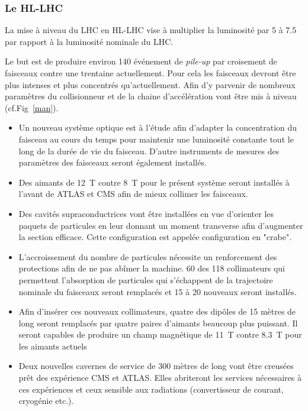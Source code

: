 \subsubsection{Le HL-LHC}
La mise à niveau du LHC en HL-LHC vise à multiplier la luminosité par \num{5} à \num{7.5} par rapport à la luminosité nominale du LHC.

Le but est de produire environ \num{140} événement de \textit{pile-up} par croisement de faisceaux contre une trentaine actuellement. Pour cela les faisceaux devront être plus intenses et plus concentrés qu'actuellement. Afin d'y parvenir de nombreux paramètres du collisionneur et de la chaine d'accélération vont être mis à niveau (cf.Fig~\ref{man}).

\begin{itemize}[label=$\bullet$]
	
 \item Un nouveau système optique est à l'étude afin d'adapter la concentration du faisceau au cours du temps pour maintenir une luminosité constante tout le long de la durée de vie du faisceau. D'autre instruments de mesures des paramètres des faisceaux seront également installés.
 
 \item Des aimants de \SI{12}{\tesla} contre \SI{8}{\tesla} pour le présent système seront installés à l'avant de ATLAS et CMS afin de mieux collimer les faisceaux.
 
 \item Des cavités supraconductrices vont être installées en vue d'orienter les paquets de particules en leur donnant un moment transverse afin d'augmenter la section efficace. Cette configuration est appelée configuration en "crabe".
 
 \item L'accroissement du nombre de particules nécessite un renforcement des protections afin de ne pas abîmer la machine. \num{60} des \num{118} collimateurs qui permettent l'absorption de particules qui s'échappent de la trajectoire nominale du faisceaux seront remplacés et \num{15} à \num{20} nouveaux seront installés.
 
 \item Afin d'insérer ces nouveaux collimateurs, quatre des dipôles de \num{15} mètres de long seront remplacés par quatre paires d'aimants beaucoup plus puissant. Il seront capables de produire un champ magnétique de \SI{11}{\tesla} contre \SI{8.3}{\tesla} pour les aimants actuels
 
 \item Deux nouvelles cavernes de service de \num{300} mètres de long vont être creusées prêt des expérience CMS et ATLAS. Elles abriteront les services nécessaires à ces expériences et ceux sensible aux radiations (convertisseur de courant, cryogénie etc.).
 

\end{itemize}
